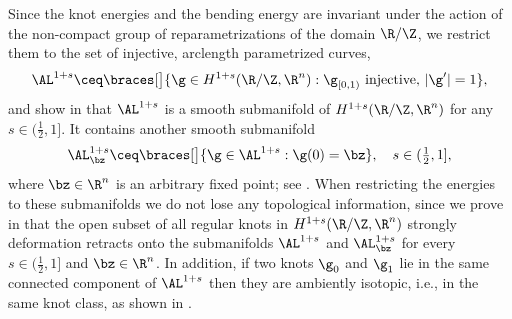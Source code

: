 Since the knot energies and the bending energy are invariant under the
action of the non-compact group of reparametrizations of the domain $\R/\Z$,
we restrict 
them to the set of injective, arclength 
parametrized curves,
\begin{equation}\label{eq:ALs}
        \AL^{1+s}
        \ceq
        \braces[\big]{
                \g\in H^{1+s}(\R/\Z,\R^n):\g_{[0,1)}\,\,\textnormal{injective}, \,|\g'|=1
        }
        ,
\end{equation}
and show in  that $\AL^{1+s}$ is
a smooth submanifold of  $H^{1+s}(\R/\Z,\R^n)$ for any $s\in (\frac{1}{2},1]$.
It contains another smooth submanifold 
\begin{equation}\label{eq:ALsz}
        \textstyle
        \AL^{1+s}_\bz
        \ceq
        \braces[\big]{\g\in\AL^{1+s}:\g(0)=\bz},\quad s\in (\frac{1}{2},1],
\end{equation}
where $\bz\in\R^n$ is an arbitrary fixed point;
see . 
When restricting the energies
to these submanifolds we do not lose any topological information, since
we prove in  that the open subset of all
regular knots in $H^{1+s}(\R/\Z,\R^n)$ strongly deformation retracts
onto the submanifolds $\AL^{1+s}$ and $\AL^{1+s}_\bz$ 
for every $s\in (\frac{1}{2},1]$
and $\bz\in\R^n$. 
In addition, if two knots $\g_0$ and $\g_1$ lie in
the same connected component of $\AL^{1+s}$ then they are ambiently isotopic,
i.e., in the same knot class,
as shown in .


